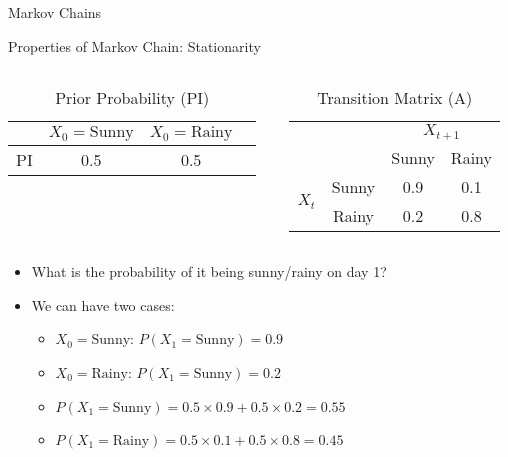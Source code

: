 \documentclass{beamer}
\begin{document}
\begin{section}{Markov Chains}
\begin{frame}{Properties of Markov Chain: Stationarity}
        \begin{columns}[T] %
          \begin{column}{0.48\textwidth} %
            \begin{table}[h]
              \centering
              \caption{Prior Probability (PI)}
              \begin{tabular}{cccc}
                \toprule
                & \(X_0 = \text{Sunny}\) & \(X_0 = \text{Rainy}\) \\
                \midrule
                PI & 0.5 & 0.5 \\
                \bottomrule
              \end{tabular}
            \end{table}
          \end{column}
          \begin{column}{0.48\textwidth} %
            \begin{table}[h]
              \centering
              \caption{Transition Matrix (A)}
              \begin{tabular}{cccc}
                \toprule
                & & \multicolumn{2}{c}{\(X_{t+1}\)} \\
                \cmidrule{3-4}
                & & Sunny & Rainy \\
                \midrule
                \multirow{2}{*}{\(X_t\)} & Sunny & 0.9 & 0.1 \\
                & Rainy & 0.2 & 0.8 \\
                \bottomrule
              \end{tabular}
            \end{table}
          \end{column}
        \end{columns}

        \begin{itemize}
            \item What is the probability of it being sunny/rainy on day 1?
            \pause \item We can have two cases:
            \begin{itemize}
                \item $X_0 = \text{Sunny}$: $P(X_1 = \text{Sunny}) = 0.9$
                \item $X_0 = \text{Rainy}$: $P(X_1 = \text{Sunny}) = 0.2$   
                \item $P(X_1 = \text{Sunny}) = 0.5 \times 0.9 + 0.5 \times 0.2 = 0.55$
                \item $P(X_1 = \text{Rainy}) = 0.5 \times 0.1 + 0.5 \times 0.8 = 0.45$
            \end{itemize}
                


\end{itemize}
\end{frame}
\end{section}
\end{document}
